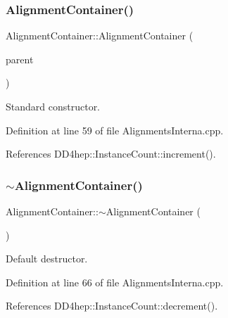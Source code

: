 \subsubsection{\texorpdfstring{Alignment\+Container()}{AlignmentContainer()}}
{\footnotesize\ttfamily Alignment\+Container\+::\+Alignment\+Container (\begin{DoxyParamCaption}\item[{\hyperlink{class_d_d4hep_1_1_geometry_1_1_det_element_object}{Geometry\+::\+Det\+Element\+Object} $\ast$}]{parent }\end{DoxyParamCaption})}



Standard constructor. 



Definition at line 59 of file Alignments\+Interna.\+cpp.



References D\+D4hep\+::\+Instance\+Count\+::increment().

\hypertarget{class_d_d4hep_1_1_alignments_1_1_interna_1_1_alignment_container_ab3390799871933e6408bbe0c0ff41444}{}\label{class_d_d4hep_1_1_alignments_1_1_interna_1_1_alignment_container_ab3390799871933e6408bbe0c0ff41444} 
\subsubsection{\texorpdfstring{$\sim$\+Alignment\+Container()}{~AlignmentContainer()}}
{\footnotesize\ttfamily Alignment\+Container\+::$\sim$\+Alignment\+Container (\begin{DoxyParamCaption}{ }\end{DoxyParamCaption})\hspace{0.3cm}{\ttfamily [virtual]}}



Default destructor. 



Definition at line 66 of file Alignments\+Interna.\+cpp.



References D\+D4hep\+::\+Instance\+Count\+::decrement().



